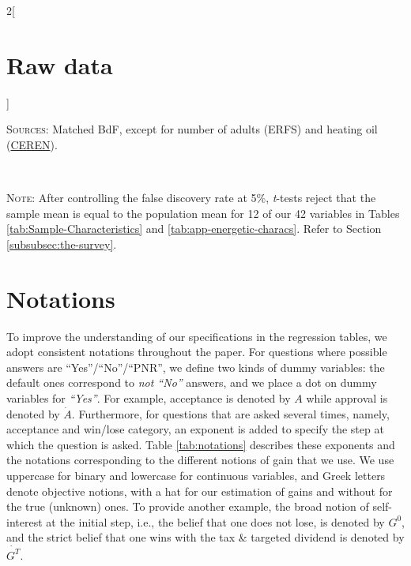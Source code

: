 \documentclass[12pt]{article} %
\begin{document}
\begin{appendices}
\begin{multicols}{2}[\section{Raw data\label{sec:Raw-Data}}]
\begin{minipage}[t]{.45\textwidth}
\begin{table}[H]
     \footnotesize{ \parbox[t]{7.5cm } {\linespread{1.2}\selectfont \textsc{Sources:} Matched BdF, except for number of adults (ERFS) and heating oil (\href{https://www.lesechos.fr/industrie-services/energie-environnement/le-chauffage-au-fioul-devient-de-plus-en-plus-cher-147372}{CEREN}).}} \\[1.5ex]
     {\footnotesize \parbox[t]{7.5cm } {\linespread{1.2}\selectfont \textsc{Note:} After controlling the false discovery rate at 5\%, \textit{t}-tests reject that the sample mean is equal to the population mean for 12 of our 42 variables in Tables \ref{tab:Sample-Characteristics} and \ref{tab:app-energetic-characs}. Refer to Section \vref{subsubsec:the-survey}. }} %
\end{table}
\end{minipage}

\end{multicols}
\restoregeometry


\section{Notations}\label{sec:notations}


To improve the understanding of our specifications in the regression tables, we adopt consistent notations throughout the paper. For questions where possible answers are ``Yes''/``No''/``PNR'', we define two kinds of dummy variables: the default ones correspond to \textit{not ``No''} answers, and we place a dot on dummy variables for \textit{``Yes''}. For example, acceptance is denoted by $A$ while approval is denoted by $\dot{A}$. Furthermore, for questions that are asked several times, namely, acceptance and win/lose category, an exponent is added to specify the step at which the question is asked. Table \ref{tab:notations} describes these exponents and the notations corresponding to the different notions of gain that we use. We use uppercase for binary and lowercase for continuous variables, and Greek letters denote objective notions, with a hat for our estimation of gains and without for the true (unknown) ones. To provide another example, the broad notion of self-interest at the initial step, i.e., the belief that one does not lose, is denoted by $G^0$, and the strict belief that one wins with the tax \& targeted dividend is denoted by $\dot{G^T}$. %


\end{appendices}
\end{document}
